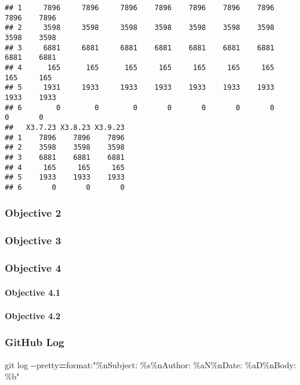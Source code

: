 \documentclass[
]{article}
\newenvironment{Shaded}{\begin{snugshade}}{\end{snugshade}}
\newcommand{\AttributeTok}[1]{\textcolor[rgb]{0.77,0.63,0.00}{#1}}
\newcommand{\FunctionTok}[1]{\textcolor[rgb]{0.00,0.00,0.00}{#1}}
\newcommand{\NormalTok}[1]{#1}
\newcommand{\OperatorTok}[1]{\textcolor[rgb]{0.81,0.36,0.00}{\textbf{#1}}}
\newcommand{\StringTok}[1]{\textcolor[rgb]{0.31,0.60,0.02}{#1}}
\begin{document}
\begin{verbatim}
## 1     7896     7896     7896    7896    7896    7896    7896    7896    7896
## 2     3598     3598     3598    3598    3598    3598    3598    3598    3598
## 3     6881     6881     6881    6881    6881    6881    6881    6881    6881
## 4      165      165      165     165     165     165     165     165     165
## 5     1931     1933     1933    1933    1933    1933    1933    1933    1933
## 6        0        0        0       0       0       0       0       0       0
##   X3.7.23 X3.8.23 X3.9.23
## 1    7896    7896    7896
## 2    3598    3598    3598
## 3    6881    6881    6881
## 4     165     165     165
## 5    1933    1933    1933
## 6       0       0       0
\end{verbatim}

\hypertarget{objective-2}{%
\subsubsection{Objective 2}\label{objective-2}}

\hypertarget{objective-3}{%
\subsubsection{Objective 3}\label{objective-3}}

\hypertarget{objective-4}{%
\subsubsection{Objective 4}\label{objective-4}}

\hypertarget{objective-4.1}{%
\paragraph{Objective 4.1}\label{objective-4.1}}

\hypertarget{objective-4.2}{%
\paragraph{Objective 4.2}\label{objective-4.2}}

\hypertarget{github-log}{%
\subsubsection{GitHub Log}\label{github-log}}

\begin{Shaded}
\begin{Highlighting}[]
\FunctionTok{git}\NormalTok{ log }\AttributeTok{{-}{-}pretty}\OperatorTok{=}\NormalTok{format:}\StringTok{"\%nSubject: \%s\%nAuthor: \%aN\%nDate: \%aD\%nBody: \%b"}
\end{Highlighting}
\end{Shaded}
\end{document}
